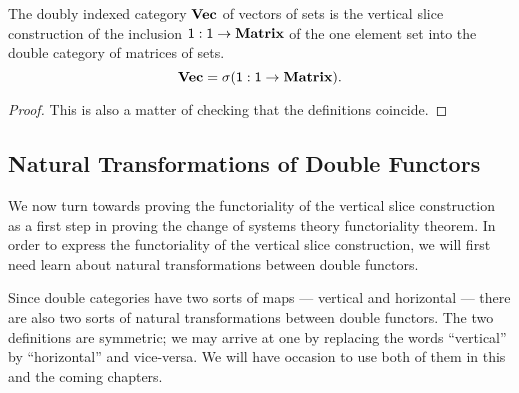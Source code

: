 \documentclass[DynamicalBook]{subfiles}
\begin{document}
\begin{proposition}
The doubly indexed category $\textbf{Vec}$ of vectors of sets is the vertical slice
construction of the inclusion $\mathsf{1} : \mathsf{1} \to \textbf{Matrix}$ of the one
element set into the double category of matrices of sets.
$$\textbf{Vec} = \sigma (\mathsf{1} : \mathsf{1} \to \textbf{Matrix}).$$
\end{proposition}
\begin{proof}
This is also a matter of checking that the definitions coincide.
\end{proof}

\subsection{Natural Transformations of Double Functors}
We now turn towards proving the functoriality of the vertical slice construction
as a first step in proving the change of systems theory functoriality theorem. In order to express
the functoriality of the vertical slice construction, we will first need learn
about natural transformations between double functors.

Since double categories have two sorts of maps --- vertical and horizontal ---
there are also two sorts of natural transformations between double functors. The
two definitions are symmetric; we may arrive at one by replacing the words
``vertical'' by ``horizontal'' and vice-versa. We will have occasion to use both
of them in this and the coming chapters.
\end{document}
